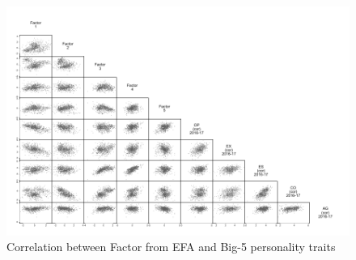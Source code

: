 \documentclass[a4paper, 12pt, onecolumn]{article}
\begin{document}
\begin{figure}[!htb]
\raggedright
\includegraphics[scale=0.85]{INPUT/matrix_b5_efa}
\caption{Correlation between Factor from EFA and Big-5 personality traits}
\label{fig:descXY}
\end{figure}










\end{document}

